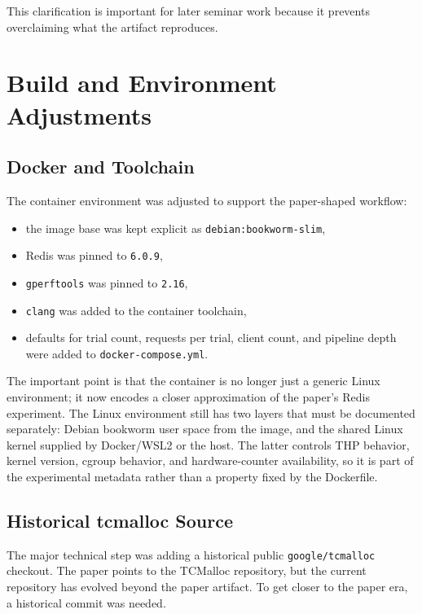 \documentclass[a4paper,11pt]{article}
\begin{document}
This clarification is important for later seminar work because it prevents overclaiming what the artifact reproduces.

\section{Build and Environment Adjustments}

\subsection{Docker and Toolchain}

The container environment was adjusted to support the paper-shaped workflow:

\begin{itemize}[leftmargin=1.5em]
  \item the image base was kept explicit as \texttt{debian:bookworm-slim},
  \item Redis was pinned to \texttt{6.0.9},
  \item \texttt{gperftools} was pinned to \texttt{2.16},
  \item \texttt{clang} was added to the container toolchain,
  \item defaults for trial count, requests per trial, client count, and pipeline depth were added to \texttt{docker-compose.yml}.
\end{itemize}

The important point is that the container is no longer just a generic Linux
environment; it now encodes a closer approximation of the paper's Redis
experiment. The Linux environment still has two layers that must be documented
separately: Debian bookworm user space from the image, and the shared Linux
kernel supplied by Docker/WSL2 or the host. The latter controls THP behavior,
kernel version, cgroup behavior, and hardware-counter availability, so it is
part of the experimental metadata rather than a property fixed by the
Dockerfile.

\subsection{Historical tcmalloc Source}

The major technical step was adding a historical public \texttt{google/tcmalloc} checkout.
The paper points to the TCMalloc repository, but the current repository has evolved beyond the paper artifact.
To get closer to the paper era, a historical commit was needed.
\end{document}
